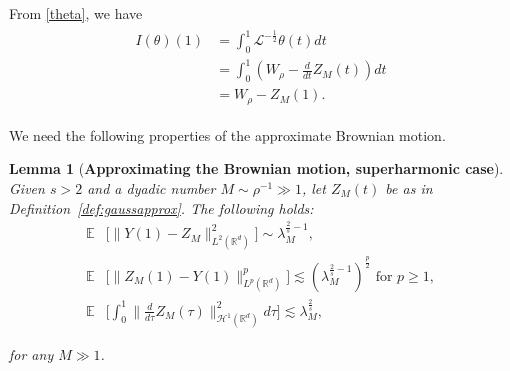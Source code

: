 \documentclass[%
11pt,  reqno]{amsart}
\newtheorem{lemma}[theorem]{Lemma}
\theoremstyle{remarkstyle}
\newcommand{\1}{\hspace{0.2mm}\text{I}\hspace{0.2mm}}
\newcommand{\noi}{\noindent}
\newcommand{\R}{\mathbb{R}}
\newcommand{\E}{\mathbb{E}}
\renewcommand{\L}{\mathcal{L}}
\newcommand{\ld}{\lambda}
\newcommand{\les}{\lesssim}
\renewcommand{\H}{\mathcal{H}}
\numberwithin{equation}{section}
\numberwithin{theorem}{section}
\begin{document}
	From \eqref{theta}, we have
	\begin{align}
		\label{Itheta}
		\begin{split}
			I (\theta) (1) & =  \int_0^1   \L^{-\frac12} \theta (t) dt \\
			& = \int_0^1 ( W_\rho - \frac{d}{dt} Z_M (t)) dt\\
			& = W_\rho - Z_{M}(1).
		\end{split}
	\end{align}
	
	We need the following properties of the approximate Brownian motion.
	
	\begin{lemma}[\textbf{Approximating the Brownian motion, superharmonic case}]
		\label{LEM:appro2}\mbox{}\\
		Given $s > 2$ and a dyadic number $M \sim \rho^{-1} \gg 1$, let $Z_M(t)$ be as in Definition~\ref{def:gaussapprox}. The following holds:
		\begin{align}
			\E& \big[ \|Y(1) - Z_M\|_{L^2 ({\R^d})}^2 \big] \sim \ld_M^{\frac2s - 1}, \label{L2_1} \\
			\E & \big[\| Z_M  (1) - Y (1) \|_{L^p(\R^d)}^p \big] \les \left(\ld_M^{\frac2s - 1}\right)^{\frac{p}2}  \text{ for } p\ge 1, \label{Lp}\\
			\E & \bigg[\int_0^1 \Big\| \frac d {d\tau} Z_M(\tau) \Big\|^2_{\H^1(\R^d)}d\tau \bigg] \les  \ld_M^{\frac2s}, \label{dZL2}
		\end{align}
		
		\noi
		for any $M \gg 1$.
	\end{lemma}
	
\end{document}
